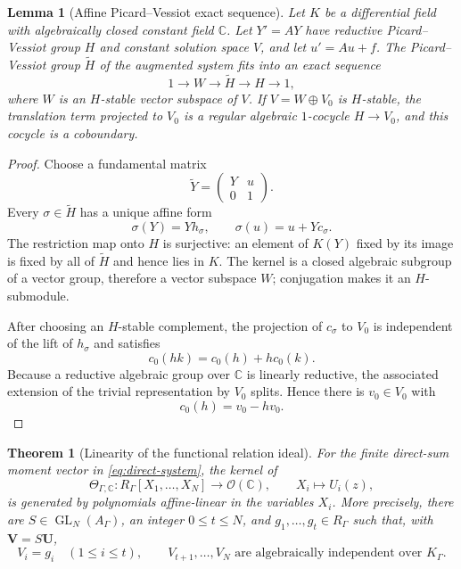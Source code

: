 \documentclass[11pt]{article}
\numberwithin{equation}{section}
\newtheorem{theorem}{Theorem}[section]
\newtheorem{lemma}[lemma]{Lemma}
\theoremstyle{definition}
\theoremstyle{remark}
\newcommand{\C}{\mathbb C}
\begin{document}
\begin{lemma}[Affine Picard--Vessiot exact sequence]
\label{lem:affine-exact-sequence}
Let $K$ be a differential field with algebraically closed constant field
$\C$.  Let $Y'=AY$ have reductive Picard--Vessiot group $H$ and constant
solution space $V$, and let $u'=Au+f$.  The Picard--Vessiot group
$\widetilde H$ of the augmented system fits into an exact sequence
\begin{equation}\label{eq:affine-exact-sequence}
  1\longrightarrow W\longrightarrow\widetilde H
  \longrightarrow H\longrightarrow1,
\end{equation}
where $W$ is an $H$-stable vector subspace of $V$.  If
$V=W\oplus V_0$ is $H$-stable, the translation term projected to $V_0$ is
a regular algebraic $1$-cocycle $H\to V_0$, and this cocycle is a
coboundary.
\end{lemma}

\begin{proof}
Choose a fundamental matrix
\[
  \widetilde Y=
  \begin{pmatrix}Y&u\\0&1\end{pmatrix}.
\]
Every $\sigma\in\widetilde H$ has a unique affine form
\[
  \sigma(Y)=Yh_\sigma,
  \qquad
  \sigma(u)=u+Yc_\sigma.
\]
The restriction map onto $H$ is surjective: an element of $K(Y)$ fixed by
its image is fixed by all of $\widetilde H$ and hence lies in $K$.  The
kernel is a closed algebraic subgroup of a vector group, therefore a vector
subspace $W$; conjugation makes it an $H$-submodule.

After choosing an $H$-stable complement, the projection of $c_\sigma$ to
$V_0$ is independent of the lift of $h_\sigma$ and satisfies
\[
  c_0(hk)=c_0(h)+h c_0(k).
\]
Because a reductive algebraic group over $\C$ is linearly reductive, the
associated extension of the trivial representation by $V_0$ splits.  Hence
there is $v_0\in V_0$ with
\[
  c_0(h)=v_0-hv_0.
\]
\end{proof}

\begin{theorem}[Linearity of the functional relation ideal]
\label{thm:functional-linearity}
For the finite direct-sum moment vector in \eqref{eq:direct-system}, the
kernel of
\begin{equation}\label{eq:functional-map-C}
  \Theta_{\Gamma,\C}:
  R_\Gamma[X_1,\ldots,X_N]\longrightarrow\mathscr O(\C),
  \qquad
  X_i\longmapsto U_i(z),
\end{equation}
is generated by polynomials affine-linear in the variables $X_i$.
More precisely, there are $S\in\operatorname{GL}_N(A_\Gamma)$, an integer
$0\le t\le N$, and $g_1,\ldots,g_t\in R_\Gamma$ such that, with
$\mathbf V=S\mathbf U$,
\begin{equation}\label{eq:split-coordinates}
  V_i=g_i\quad(1\le i\le t),
  \qquad
  V_{t+1},\ldots,V_N
  \text{ are algebraically independent over }K_\Gamma.
\end{equation}
\end{theorem}
\end{document}
